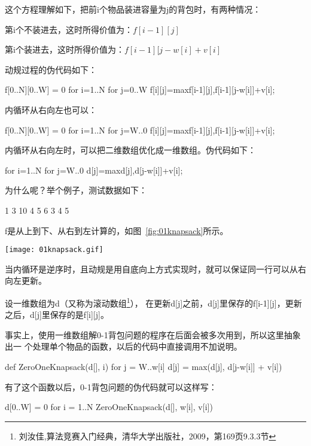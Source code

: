 这个方程理解如下，把前i个物品装进容量为j的背包时，有两种情况：
\begindot
\item 第i个不装进去，这时所得价值为：$f[i-1][j]$
\item 第i个装进去，这时所得价值为：$f[i-1][j-w[i]+v[i]$
\myenddot

动规过程的伪代码如下：
\begin{Code}
f[0..N][0..W] = 0
for i=1..N
    for j=0..W
        f[i][j]=max{f[i-1][j],f[i-1][j-w[i]]+v[i]};
\end{Code}

内循环从右向左也可以：
\begin{Code}
f[0..N][0..W] = 0
for i=1..N
    for j=W..0
        f[i][j]=max{f[i-1][j],f[i-1][j-w[i]]+v[i]};
\end{Code}

内循环从右向左时，可以把二维数组优化成一维数组。伪代码如下：
\begin{Code}
for i=1..N
    for j=W..0
        d[j]=max{d[j],d[j-w[i]]+v[i]};
\end{Code}

为什么呢？举个例子，测试数据如下：
\begin{Code}
1
3 10
4 5 6
3 4 5
\end{Code}

f是从上到下、从右到左计算的，如图~\ref{fig:01knapsack}所示。
\begin{center}
\texttt{[image: 01knapsack.gif]}\\
\label{fig:01knapsack}
\end{center}

当内循环是逆序时，且动规是用自底向上方式实现时，就可以保证同一行可以从右向左更新。

设一维数组为d（又称为滚动数组\footnote{刘汝佳,算法竞赛入门经典，清华大学出版社，2009，第169页9.3.3节}），
在更新d[j]之前，d[j]里保存的f[i-1][j]，更新之后，d[j]里保存的是f[i][j]。

事实上，使用一维数组解0-1背包问题的程序在后面会被多次用到，所以这里抽象出一
个处理单个物品的函数，以后的代码中直接调用不加说明。
\begin{Code}
def ZeroOneKnapsack(d[], i)
    for j = W..w[i]
        d[j] = max(d[j], d[j-w[i]] + v[i])
\end{Code}

有了这个函数以后，0-1背包问题的伪代码就可以这样写：
\begin{Code}
d[0..W] = 0
for i = 1..N
    ZeroOneKnapsack(d[], w[i], v[i])
\end{Code}

